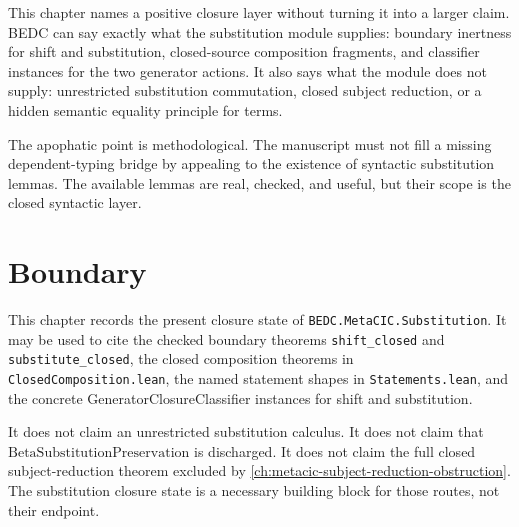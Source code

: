 This chapter names a positive closure layer without turning it into a larger
claim. BEDC can say exactly what the substitution module supplies: boundary
inertness for shift and substitution, closed-source composition fragments,
and classifier instances for the two generator actions. It also says what the
module does not supply: unrestricted substitution commutation, closed subject
reduction, or a hidden semantic equality principle for terms.

The apophatic point is methodological. The manuscript must not fill a missing
dependent-typing bridge by appealing to the existence of syntactic
substitution lemmas. The available lemmas are real, checked, and useful, but
their scope is the closed syntactic layer.

\section{Boundary}
\label{sec:metacic-substitution-audit-map-boundary}

This chapter records the present closure state of
\texttt{BEDC.MetaCIC.Substitution}. It may be used to cite the checked
boundary theorems \texttt{shift\_closed} and \texttt{substitute\_closed}, the
closed composition theorems in \texttt{ClosedComposition.lean}, the named
statement shapes in \texttt{Statements.lean}, and the concrete
GeneratorClosureClassifier instances for shift and substitution.

It does not claim an unrestricted substitution calculus. It does not claim
that $\mathrm{BetaSubstitutionPreservation}$ is discharged. It does not claim
the full closed subject-reduction theorem excluded by
\autoref{ch:metacic-subject-reduction-obstruction}. The substitution closure
state is a necessary building block for those routes, not their endpoint.

